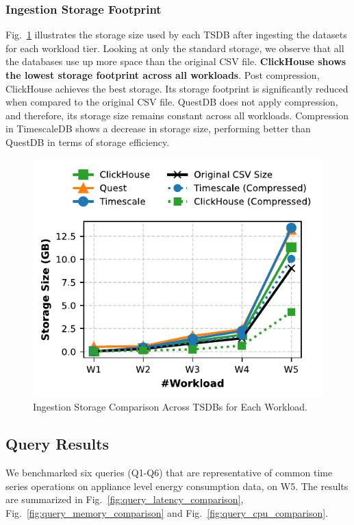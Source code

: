 \documentclass[conference]{IEEEtran}
\begin{document}
\subsubsection{Ingestion Storage Footprint}
Fig.~\ref{fig:ingestion_storage_comparison} illustrates the storage size used by each TSDB after ingesting the datasets for each workload tier. Looking at only the standard storage, we observe that all the databases use up more space than the original CSV file. \textbf{ClickHouse shows the lowest storage footprint across all workloads}. Post compression, ClickHouse achieves the best storage. Its storage footprint is significantly reduced when compared to the original CSV file. QuestDB does not apply compression, and therefore, its storage size remains constant across all workloads. Compression in TimescaleDB shows a decrease in storage size, performing better than QuestDB in terms of storage efficiency.
\begin{figure}[tb]
\centering
\includegraphics[width=1.0\linewidth]{3_ing_storage_plot.pdf}
\caption{Ingestion Storage Comparison Across TSDBs for Each Workload.}
\label{fig:ingestion_storage_comparison}
\end{figure}

\subsection{Query Results}
We benchmarked six queries (Q1-Q6) that are representative of common time series operations on appliance level energy consumption data, on W5. The results are summarized in Fig.~\ref{fig:query_latency_comparison}, Fig.~\ref{fig:query_memory_comparison} and Fig.~\ref{fig:query_cpu_comparison}.
\end{document}
